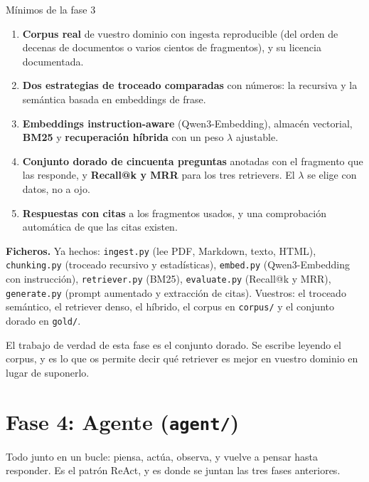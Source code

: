 \documentclass[11pt,a4paper]{article}
\newcommand{\file}[1]{{\small\texttt{\textcolor{arcablue}{#1}}}}
\begin{document}
\begin{minimos}{Mínimos de la fase 3}
\begin{enumerate}
  \item \textbf{Corpus real} de vuestro dominio con ingesta reproducible (del orden de
  decenas de documentos o varios cientos de fragmentos), y su licencia documentada.
  \item \textbf{Dos estrategias de troceado comparadas} con números: la recursiva y la
  semántica basada en embeddings de frase.
  \item \textbf{Embeddings instruction-aware} (Qwen3-Embedding), almacén vectorial,
  \textbf{BM25} y \textbf{recuperación híbrida} con un peso $\lambda$ ajustable.
  \item \textbf{Conjunto dorado de cincuenta preguntas} anotadas con el fragmento que las
  responde, y \textbf{Recall@k y MRR} para los tres retrievers. El $\lambda$ se elige con
  datos, no a ojo.
  \item \textbf{Respuestas con citas} a los fragmentos usados, y una comprobación automática
  de que las citas existen.
\end{enumerate}
\end{minimos}

\textbf{Ficheros.} Ya hechos: \file{ingest.py} (lee PDF, Markdown, texto, HTML),
\file{chunking.py} (troceado recursivo y estadísticas), \file{embed.py} (Qwen3-Embedding con
instrucción), \file{retriever.py} (BM25), \file{evaluate.py} (Recall@k y MRR),
\file{generate.py} (prompt aumentado y extracción de citas). Vuestros: el troceado semántico,
el retriever denso, el híbrido, el corpus en \file{corpus/} y el conjunto dorado en
\file{gold/}.

El trabajo de verdad de esta fase es el conjunto dorado. Se escribe leyendo el corpus, y es
lo que os permite decir qué retriever es mejor en vuestro dominio en lugar de suponerlo.

\section{Fase 4: Agente (\file{agent/})}

Todo junto en un bucle: piensa, actúa, observa, y vuelve a pensar hasta responder. Es el
patrón ReAct, y es donde se juntan las tres fases anteriores.
\end{document}
